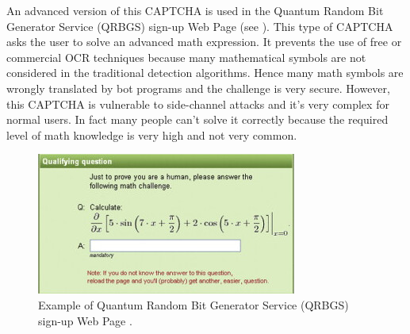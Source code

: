 An advanced version of this CAPTCHA is used in the Quantum Random Bit Generator Service (QRBGS) sign-up Web Page\cite{math_CAPTCHA} (see ). This type of CAPTCHA asks the user to solve an advanced math expression. It prevents the use of free or commercial OCR techniques because many mathematical symbols are not considered in the traditional detection algorithms. Hence many math symbols are wrongly translated by bot programs and the challenge is very secure. However, this CAPTCHA is vulnerable to side-channel attacks \cite{math_CAPTCHA} and it's very complex for normal users. In fact many people can't solve it correctly because the required level of math knowledge is very high and not very common.
\begin{figure}[h]
     \centering
     \includegraphics[width=.6\linewidth]{Images/StateOfArt/QRBGS}
     \caption{\footnotesize{Example of Quantum Random Bit Generator Service (QRBGS) sign-up Web Page \cite{math_CAPTCHA}.}}\label{soa:QRBGS}
\end{figure}

